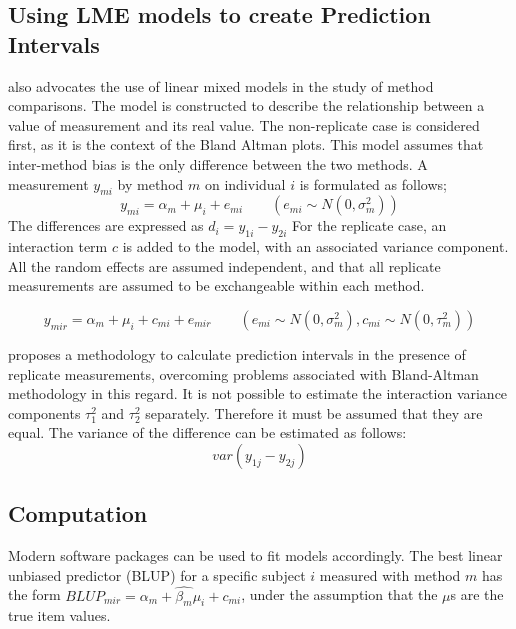 \documentclass[12pt, a4paper]{report}
\theoremstyle{plain}
\theoremstyle{definition}
\theoremstyle{remark}
\begin{document}
	\subsection{Using LME models to create Prediction Intervals}
	\citet{BXC2004} also advocates the use of linear mixed models in
	the study of method comparisons. The model is constructed to
	describe the relationship between a value of measurement and its
	real value. The non-replicate case is considered first, as it is
	the context of the Bland Altman plots. This model assumes that
	inter-method bias is the only difference between the two methods.
	A measurement $y_{mi}$ by method $m$ on individual $i$ is
	formulated as follows;
	\begin{equation}
	y_{mi}  = \alpha_{m} + \mu_{i} + e_{mi} \qquad ( e_{mi} \sim
	N(0,\sigma^{2}_{m}))
	\end{equation}
	The differences are expressed as $d_{i} = y_{1i} - y_{2i}$ For the
	replicate case, an interaction term $c$ is added to the model,
	with an associated variance component. All the random effects are
	assumed independent, and that all replicate measurements are
	assumed to be exchangeable within each method.
	
	\begin{equation}
	y_{mir}  = \alpha_{m} + \mu_{i} + c_{mi} + e_{mir} \qquad ( e_{mi}
	\sim N(0,\sigma^{2}_{m}), c_{mi} \sim N(0,\tau^{2}_{m}))
	\end{equation}
	
	\citet{BXC2008} proposes a methodology to calculate prediction
	intervals in the presence of replicate measurements, overcoming
	problems associated with Bland-Altman methodology in this regard.
	It is not possible to estimate the interaction variance components
	$\tau^{2}_{1}$ and $\tau^{2}_{2}$ separately. Therefore it must be
	assumed that they are equal. The variance of the difference can be
	estimated as follows:
	\begin{equation}
	var(y_{1j}-y_{2j})
	\end{equation}
	
	\subsection{Computation} Modern software
	packages can be used to fit models accordingly. The best linear
	unbiased predictor (BLUP) for a specific subject $i$ measured with
	method $m$ has the form $BLUP_{mir} = \hat{\alpha_{m}} +
	\hat{\beta_{m}}\mu_{i} + c_{mi}$, under the assumption that the
	$\mu$s are the true item values.
	
\end{document}
